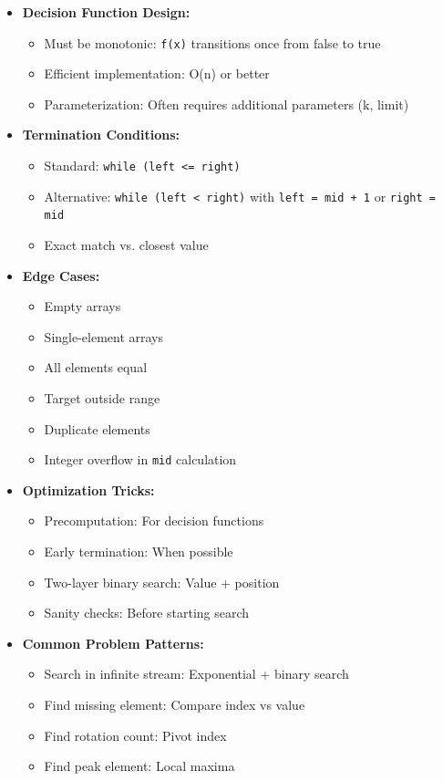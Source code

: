 \documentclass[a4paper,10pt]{book}
\begin{document}
\begin{itemize}
    \item \textbf{Decision Function Design:}
    \begin{itemize}
        \item Must be monotonic: \texttt{f(x)} transitions once from false to true
        \item Efficient implementation: O(n) or better
        \item Parameterization: Often requires additional parameters (k, limit)
    \end{itemize}
    
    \item \textbf{Termination Conditions:}
    \begin{itemize}
        \item Standard: \texttt{while (left <= right)}
        \item Alternative: \texttt{while (left < right)} with \texttt{left = mid + 1} or \texttt{right = mid}
        \item Exact match vs. closest value
    \end{itemize}
    
    \item \textbf{Edge Cases:}
    \begin{itemize}
        \item Empty arrays
        \item Single-element arrays
        \item All elements equal
        \item Target outside range
        \item Duplicate elements
        \item Integer overflow in \texttt{mid} calculation
    \end{itemize}
    
    \item \textbf{Optimization Tricks:}
    \begin{itemize}
        \item Precomputation: For decision functions
        \item Early termination: When possible
        \item Two-layer binary search: Value + position
        \item Sanity checks: Before starting search
    \end{itemize}
    
    \item \textbf{Common Problem Patterns:}
    \begin{itemize}
        \item Search in infinite stream: Exponential + binary search
        \item Find missing element: Compare index vs value
        \item Find rotation count: Pivot index
        \item Find peak element: Local maxima
    \end{itemize}
    

\end{itemize}
\end{document}
